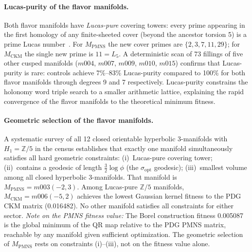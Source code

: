 ﻿\documentclass[12pt]{article}
\theoremstyle{definition}
\begin{document}
\paragraph{Lucas-purity of the flavor manifolds.}
Both flavor manifolds have \emph{Lucas-pure} covering towers: every prime
appearing in the first homology of any finite-sheeted cover (beyond the
ancestor torsion 5) is a prime Lucas number~\cite{Gentry:Lucas}.
For $M_\mathrm{PMNS}$ the new cover primes are $\{2,3,7,11,29\}$;
for $M_\mathrm{CKM}$ the single new prime is $11 = L_5$.
A deterministic scan of 73 fillings of five other cusped manifolds
($m004$, $m007$, $m009$, $m010$, $m015$) confirms that Lucas-purity
is rare: controls achieve 7\%--83\% Lucas-purity compared to 100\%
for both flavor manifolds through degrees 9 and 7 respectively.
Lucas-purity constrains the holonomy word triple search to a smaller
arithmetic lattice, explaining the rapid convergence of the flavor
manifolds to the theoretical minimum fitness.

\paragraph{Geometric selection of the flavor manifolds.}
A systematic survey of all 12 closed orientable hyperbolic 3-manifolds
with $H_1=\mathbb{Z}/5$ in the census establishes that exactly one
manifold simultaneously satisfies all hard geometric constraints:
(i)~Lucas-pure covering tower; (ii)~contains a geodesic of length
$\tfrac{3}{2}\log\phi$ (the $\sigma_\mathrm{opt}$ geodesic);
(iii)~smallest volume among all closed hyperbolic 3-manifolds.
That manifold is $M_\mathrm{PMNS} = m003(-2,3)$. Among Lucas-pure
$\mathbb{Z}/5$ manifolds, $M_\mathrm{CKM} = m006(-5,2)$ achieves
the lowest Gaussian kernel fitness to the PDG CKM matrix (0.016482).
No other manifold satisfies all constraints for either sector.
\emph{Note on the PMNS fitness value:} The Borel construction
fitness 0.005087 is the global minimum of the QR map relative to
the PDG PMNS matrix, reachable by any manifold given sufficient
optimization. The geometric selection of $M_\mathrm{PMNS}$ rests
on constraints (i)--(iii), not on the fitness value alone.
\end{document}
